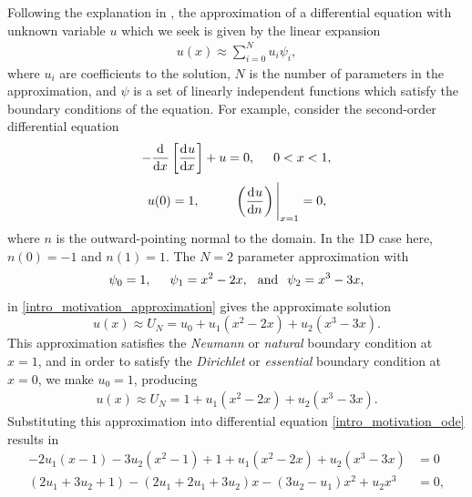 Following the explanation in \citet{reddy_1993}, the approximation of a differential equation with unknown variable $u$ which we seek is given by the linear expansion
\begin{align}
  \label{intro_motivation_approximation}
  u(x) \approx \sum_{i=0}^N u_i \psi_i,
\end{align}
where $u_i$ are coefficients to the solution, $N$ is the number of parameters in the approximation, and $\psi$ is a set of linearly independent functions which satisfy the boundary conditions of the equation.  For example, consider the second-order differential equation
\begin{align}
  \label{intro_motivation_ode}
  - \frac{\mathrm{d}{^{}} }{\mathrm{d} x{^{}} } \left[ \frac{\mathrm{d}{^{}} u}{\mathrm{d} x{^{}} } \right] + u = 0, \hspace{5mm} 0 < x < 1,
\end{align}
\begin{align}
  \label{intro_motivation_bcs}
  u(0) = 1, \hspace{10mm} \left( \totder{u}{n} \right) \Bigg|_{x=1} = 0,
\end{align}
where $n$ is the outward-pointing normal to the domain.  In the 1D case here, $n(0) = -1$ and $n(1) = 1$.  The $N=2$ parameter approximation with
\begin{align*}
  \psi_0 = 1, \hspace{5mm} \psi_1 = x^2 - 2x, \hspace{2.5mm} \text{and} \hspace{2.5mm} \psi_2 = x^3 - 3x,
\end{align*}
in \cref{intro_motivation_approximation} gives the approximate solution
$$u(x) \approx U_N = u_0 + u_1 (x^2 - 2x) + u_2 (x^3 - 3x).$$
This approximation satisfies the \emph{Neumann} or \emph{natural} boundary condition
 
at $x=1$, and in order to satisfy the \emph{Dirichlet} or \emph{essential} boundary condition at $x=0$, we make $u_0 = 1$, producing
\begin{align}
  \label{intro_motivation_expansion}
  u(x) \approx U_N = 1 + u_1 (x^2 - 2x) + u_2 (x^3 - 3x).
\end{align}
Substituting this approximation into differential equation \cref{intro_motivation_ode} results in
{\footnotesize
\begin{align*}
  - 2u_1(x - 1) - 3u_2(x^2 - 1) + 1 + u_1(x^2 - 2x) + u_2 (x^3 - 3x) &= 0 \\
  (2u_1 + 3u_2 + 1) - (2u_1 + 2u_1 + 3u_2)x - (3u_2 - u_1)x^2 + u_2x^3 &= 0,
\end{align*}}
